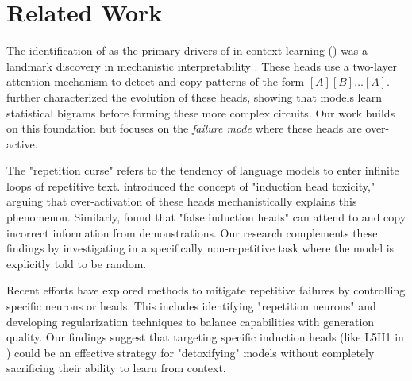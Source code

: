 \section{Related Work}
\label{sec:related_work}

The identification of \inductionheads as the primary drivers of in-context learning (\icl) was a landmark discovery in mechanistic interpretability \cite{olsson2022context}. These heads use a two-layer attention mechanism to detect and copy patterns of the form $[A][B] \dots [A]$. \citet{edelman2024evolution} further characterized the evolution of these heads, showing that models learn statistical bigrams before forming these more complex circuits. Our work builds on this foundation but focuses on the \textit{failure mode} where these heads are over-active.

The "repetition curse" refers to the tendency of language models to enter infinite loops of repetitive text. \citet{wang2025induction} introduced the concept of "induction head toxicity," arguing that over-activation of these heads mechanistically explains this phenomenon. Similarly, \citet{halawi2023overthinking} found that "false induction heads" can attend to and copy incorrect information from demonstrations. Our research complements these findings by investigating \leakage in a specifically non-repetitive task where the model is explicitly told to be random.

Recent efforts have explored methods to mitigate repetitive failures by controlling specific neurons or heads. This includes identifying "repetition neurons" and developing regularization techniques to balance \icl capabilities with generation quality. Our findings suggest that targeting specific induction heads (like L5H1 in \gpttwo) could be an effective strategy for "detoxifying" models without completely sacrificing their ability to learn from context.
